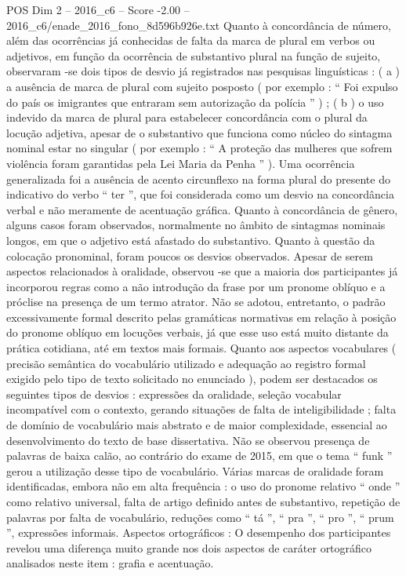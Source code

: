 \begin{textsample}{POS Dim 2 – 2016\_c6 – Score -2.00 – 2016\_c6/enade\_2016\_fono\_8d596b926e.txt}
Quanto à concordância de número, além das ocorrências já conhecidas de falta da marca de plural em verbos ou adjetivos, em função da ocorrência de substantivo plural na função de sujeito, observaram -se dois tipos de desvio já registrados nas pesquisas linguísticas : ( a ) a ausência de marca de plural com sujeito posposto ( por exemplo : “ Foi expulso do país os imigrantes que entraram sem autorização da polícia ” ) ; ( b ) o uso indevido da marca de plural para estabelecer concordância com o plural da locução adjetiva, apesar de o substantivo que funciona como núcleo do sintagma nominal estar no singular ( por exemplo : “ A proteção das mulheres que sofrem violência foram garantidas pela Lei Maria da Penha ” ).
Uma ocorrência generalizada foi a ausência de acento circunflexo na forma plural do presente do indicativo do verbo “ ter ”, que foi considerada como um desvio na concordância verbal e não meramente de acentuação gráfica.
Quanto à concordância de gênero, alguns casos foram observados, normalmente no âmbito de sintagmas nominais longos, em que o adjetivo está afastado do substantivo.
Quanto à questão da colocação pronominal, foram poucos os desvios observados.
Apesar de serem aspectos relacionados à oralidade, observou -se que a maioria dos participantes já incorporou regras como a não introdução da frase por um pronome oblíquo e a próclise na presença de um termo atrator.
Não se adotou, entretanto, o padrão excessivamente formal descrito pelas gramáticas normativas em relação à posição do pronome oblíquo em locuções verbais, já que esse uso está muito distante da prática cotidiana, até em textos mais formais.
Quanto aos aspectos vocabulares ( precisão semântica do vocabulário utilizado e adequação ao registro formal exigido pelo tipo de texto solicitado no enunciado ), podem ser destacados os seguintes tipos de desvios : expressões da oralidade, seleção vocabular incompatível com o contexto, gerando situações de falta de inteligibilidade ; falta de domínio de vocabulário mais abstrato e de maior complexidade, essencial ao desenvolvimento do texto de base dissertativa.
Não se observou presença de palavras de baixa calão, ao contrário do exame de 2015, em que o tema “ funk ” gerou a utilização desse tipo de vocabulário.
Várias marcas de oralidade foram identificadas, embora não em alta frequência : o uso do pronome relativo “ onde ” como relativo universal, falta de artigo definido antes de substantivo, repetição de palavras por falta de vocabulário, reduções como “ tá ”, “ pra ”, “ pro ”, “ prum ”, expressões informais.
Aspectos ortográficos : O desempenho dos participantes revelou uma diferença muito grande nos dois aspectos de caráter ortográfico analisados neste item : grafia e acentuação.

\end{textsample}
